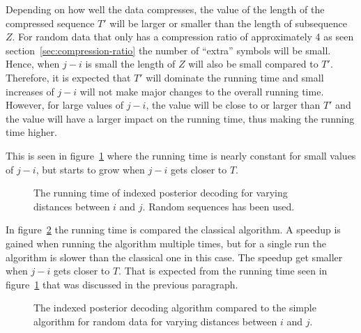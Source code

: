 Depending on how well the data compresses, the value of the length of the
compressed sequence $T'$ will be larger or smaller than the length of
subsequence $Z$. For random data that only has a compression ratio of
approximately 4 as seen section~\ref{sec:compression-ratio} the number of
``extra'' symbols will be small. Hence, when $j - i$ is small the length of $Z$
will also be small compared to $T'$. Therefore, it is expected that $T'$ will
dominate the running time and small increases of $j - i$ will not make major
changes to the overall running time. However, for large values of $j - i$, the
value will be close to or larger than $T'$ and the value will have a larger
impact on the running time, thus making the running time higher.

This is seen in
figure~\ref{fig:assymptotic_indexed_posterior_subseq_length.tex} where the
running time is nearly constant for small values of $j - i$, but starts to grow
when $j - i$ gets closer to $T$.

\begin{figure}
  \centering
  
  \caption{The running time of indexed posterior decoding for varying distances
    between $i$ and $j$. Random sequences has been used.}
  \label{fig:assymptotic_indexed_posterior_subseq_length.tex}
\end{figure}

In figure~\ref{fig:indexed_posterior_speedup_vs_subseq} the running time is
compared the classical algorithm. A speedup is gained when running the
algorithm multiple times, but for a single run the algorithm is slower than the
classical one in this case. The speedup get smaller when $j - i$ gets closer to
$T$. That is expected from the running time seen in
figure~\ref{fig:assymptotic_indexed_posterior_subseq_length.tex} that was
discussed in the previous paragraph.

\begin{figure}
  \centering
  
  \caption{The indexed posterior decoding algorithm compared to the simple
    algorithm for random data for varying distances between $i$ and $j$.}
  \label{fig:indexed_posterior_speedup_vs_subseq}
\end{figure}

